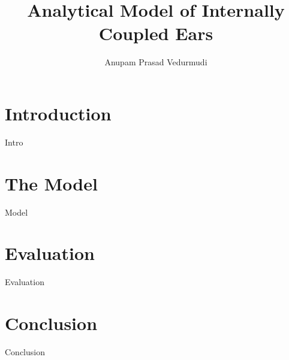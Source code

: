 \documentclass{beamer}
\title{Analytical Model of Internally Coupled Ears}
\author{Anupam Prasad Vedurmudi}
\begin{document}
\begin{frame}
 \titlepage
\end{frame}

\section{Introduction}
\begin{frame}
 Intro
\end{frame}

\section{The Model}
\begin{frame}
Model
\end{frame}

\section{Evaluation}
\begin{frame}
 Evaluation
\end{frame}

\section{Conclusion}
\begin{frame}
 Conclusion
\end{frame}
\end{document}
